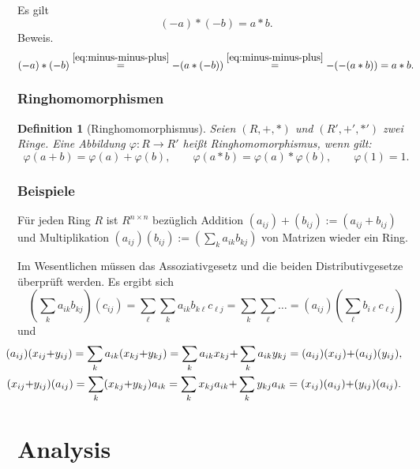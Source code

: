 \documentclass[a4paper,11pt,fleqn,twoside]{scrartcl}
\numberwithin{equation}{section}
\theoremstyle{rmbox}
\newtheorem{Definition}{Definition}
\newcommand{\emdef}[1]{\emph{#1}}
\begin{document}
Es gilt
\begin{equation}
(-a)*(-b) = a*b.
\end{equation}
Beweis.
\begin{equation}
(-a)*(-b) \stackrel{\eqref{eq:minus-minus-plus}}= -(a*(-b))
\stackrel{\eqref{eq:minus-minus-plus}}= -(-(a*b)) = a*b.
\end{equation}
\subsubsection{Ringhomomorphismen}
\begin{Definition}[Ringhomomorphismus]
Seien $(R,+,*)$ und $(R',+',*')$ zwei Ringe. Eine Abbildung
$\varphi\colon R\to R'$ heißt \emdef{Ringhomomorphismus},
wenn gilt:
\begin{equation}
\varphi(a+b) = \varphi(a)+\varphi(b),\qquad
\varphi(a*b) = \varphi(a)*\varphi(b),\qquad
\varphi(1) = 1.
\end{equation}
\end{Definition}
\subsubsection{Beispiele}
Für jeden Ring $R$ ist $R^{n\times n}$ bezüglich
Addition $(a_{ij})+(b_{ij}):=(a_{ij}+b_{ij})$
und Multiplikation $(a_{ij})(b_{ij}):=(\sum_k a_{ik}b_{kj})$
von Matrizen wieder ein Ring.

Im Wesentlichen müssen das Assoziativgesetz und die beiden
Distributivgesetze überprüft werden. Es ergibt sich
\begin{equation}
(\sum_k a_{ik}b_{kj})(c_{ij})
= \sum_\ell \sum_k a_{ik}b_{k\ell}c_{\ell j}
= \sum_k \sum_{\ell} \ldots
= (a_{ij})(\sum_\ell b_{i\ell}c_{\ell j})
\end{equation}
und
\begin{gather}
\hspace{-2.2em}(a_{ij})(x_{ij}{+}y_{ij})
= \sum_k a_{ik} (x_{kj}{+}y_{kj})
= \sum_k a_{ik} x_{kj}{+}\sum_k a_{ik}y_{kj}
= (a_{ij})(x_{ij}){+}(a_{ij})(y_{ij}),\\
\hspace{-2.2em}(x_{ij}{+}y_{ij})(a_{ij})
= \sum_k (x_{kj}{+}y_{kj})a_{ik} 
= \sum_k x_{kj}a_{ik}{+}\sum_k y_{kj}a_{ik}
= (x_{ij})(a_{ij}){+}(y_{ij})(a_{ij}).
\end{gather}

\newpage
\section{Analysis}
\end{document}
